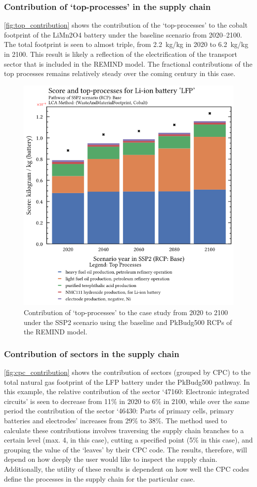 \subsubsection{Contribution of `top-processes' in the supply chain}\label{sec:results-case_study-topprocesses}

\autoref{fig:top_contribution} shows the contribution of the `top-processes' to the cobalt footprint of the LiMn2O4 battery under the baseline scenario from 2020--2100. The total footprint is seen to almost triple, from 2.2~kg/kg in 2020 to 6.2~kg/kg in 2100. This result is likely a reflection of the electrification of the transport sector that is included in the REMIND model. The fractional contributions of the top processes remains relatively steady over the coming century in this case. 

\begin{figure}[H]
    \centering
    \includegraphics[width=0.6\linewidth]{figures/top-processes.png}
    \caption{Contribution of `top-processes' to the case study from 2020 to 2100 under the SSP2 scenario using the baseline and PkBudg500 RCPs of the REMIND model.}\label{fig:top_contribution}
\end{figure}

\subsubsection{Contribution of sectors in the supply chain}\label{sec:results-case_study-topsectors}

\autoref{fig:cpc_contribution} shows the contribution of sectors (grouped by CPC) to the total natural gas footprint of the LFP battery under the PkBudg500 pathway. In this example, the relative contribution of the sector `47160: Electronic integrated circuits' is seen to decrease from 11\% in 2020 to 6\% in 2100, while over the same period the contribution of the sector `46430: Parts of primary cells, primary batteries and electrodes' increases from 29\% to 38\%. The method used to calculate these contributions involves traversing the supply chain branches to a certain level (max. 4, in this case), cutting a specified point (5\% in this case), and grouping the value of the `leaves' by their CPC code. The results, therefore, will depend on how deeply the user would like to inspect the supply chain. Additionally, the utility of these results is dependent on how well the CPC codes define the processes in the supply chain for the particular case. 

